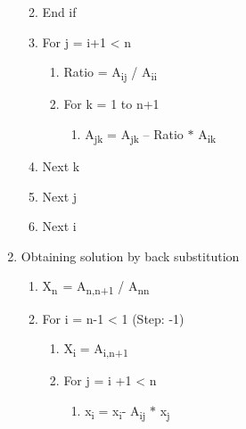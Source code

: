 \documentclass[12pt]{article}
\renewcommand{\_}{\kern-1.5pt\textunderscore\kern-1.5pt}
\begin{document}
\begin{enumerate}
\begin{enumerate}
\begin{enumerate}
\end{enumerate}
	\item End if\par

	\item For j = i+1 < n\par

\begin{enumerate}
	\item Ratio = A\textsubscript{ij }/ A\textsubscript{ii }\par

	\item For k = 1 to n+1\par

\begin{enumerate}
	\item A\textsubscript{jk }= A\textsubscript{jk }– Ratio $\ast$  A\textsubscript{ik}\par


\end{enumerate}
\end{enumerate}
	\item Next k\par

	\item Next j\par

	\item Next i\par


\end{enumerate}
	\item Obtaining solution by back substitution \par

\begin{enumerate}
	\item X\textsubscript{n\  }= A\textsubscript{n,n+1 }/ A\textsubscript{nn}\par

	\item For i = n-1 < 1 (Step: -1)\par

\begin{enumerate}
	\item X\textsubscript{i }= A\textsubscript{i,n+1 }\par

	\item For j = i +1 < n\par

\begin{enumerate}
	\item x\textsubscript{i }= x\textsubscript{i}- A\textsubscript{ij }$\ast$  x\textsubscript{j }\par



\end{enumerate}
\end{enumerate}
\end{enumerate}
\end{enumerate}
\end{document}
